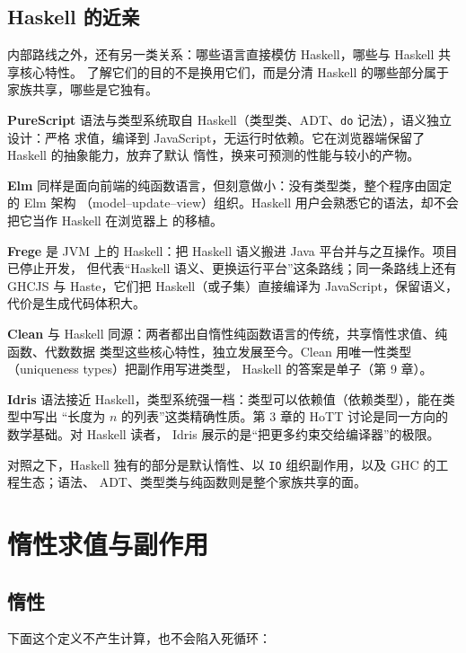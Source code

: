 \subsection{Haskell 的近亲}\label{haskell-ux7684ux8fd1ux4eb2}

内部路线之外，还有另一类关系：哪些语言直接模仿 Haskell，哪些与 Haskell 共享核心特性。
了解它们的目的不是换用它们，而是分清 Haskell 的哪些部分属于家族共享，哪些是它独有。

\textbf{PureScript} 语法与类型系统取自 Haskell（类型类、ADT、\passthrough{\lstinline!do!} 记法），语义独立设计：严格
求值，编译到 JavaScript，无运行时依赖。它在浏览器端保留了 Haskell 的抽象能力，放弃了默认
惰性，换来可预测的性能与较小的产物。

\textbf{Elm} 同样是面向前端的纯函数语言，但刻意做小：没有类型类，整个程序由固定的 Elm 架构
（model--update--view）组织。Haskell 用户会熟悉它的语法，却不会把它当作 Haskell 在浏览器上
的移植。

\textbf{Frege} 是 JVM 上的 Haskell：把 Haskell 语义搬进 Java 平台并与之互操作。项目已停止开发，
但代表“Haskell 语义、更换运行平台”这条路线；同一条路线上还有 GHCJS 与 Haste，它们把
Haskell（或子集）直接编译为 JavaScript，保留语义，代价是生成代码体积大。

\textbf{Clean} 与 Haskell 同源：两者都出自惰性纯函数语言的传统，共享惰性求值、纯函数、代数数据
类型这些核心特性，独立发展至今。Clean 用唯一性类型（uniqueness types）把副作用写进类型，
Haskell 的答案是单子（第 9 章）。

\textbf{Idris} 语法接近 Haskell，类型系统强一档：类型可以依赖值（依赖类型），能在类型中写出
“长度为 \(n\) 的列表”这类精确性质。第 3 章的 HoTT 讨论是同一方向的数学基础。对 Haskell 读者，
Idris 展示的是“把更多约束交给编译器”的极限。

对照之下，Haskell 独有的部分是默认惰性、以 \passthrough{\lstinline!IO!} 组织副作用，以及 GHC 的工程生态；语法、
ADT、类型类与纯函数则是整个家族共享的面。

\section{惰性求值与副作用}\label{ux60f0ux6027ux6c42ux503cux4e0eux526fux4f5cux7528}

\subsection{惰性}\label{ux60f0ux6027}

下面这个定义不产生计算，也不会陷入死循环：

